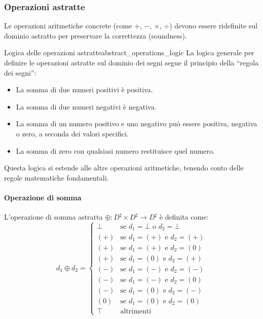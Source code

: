 \subsubsection{Operazioni astratte}
Le operazioni aritmetiche concrete (come $+$, $-$, $\times$, $\div$) devono
essere ridefinite sul dominio astratto per preservare la correttezza
(soundness).
\begin{nota}{Logica delle operazioni astratte}{abstract_operations_logic}
La logica generale per definire le operazioni astratte sul dominio dei segni
segue il principio della ``regola dei segni'':
\begin{itemize}
    \item La somma di due numeri positivi è positiva.
    \item La somma di due numeri negativi è negativa.
    \item La somma di un numero positivo e uno negativo può essere positiva,
    negativa o zero, a seconda dei valori specifici.
    \item La somma di zero con qualsiasi numero restituisce quel numero.
\end{itemize}

Questa logica si estende alle altre operazioni aritmetiche, tenendo conto
delle regole matematiche fondamentali.
\end{nota}

\paragraph{Operazione di somma}
L'operazione di somma astratta $\oplus: D^\sharp \times D^\sharp \to D^\sharp$
è definita come:
\[
d_1 \oplus d_2 =
\begin{cases}
    \bot & \text{se } d_1 = \bot \text{ o } d_2 = \bot \\
    (+) & \text{se } d_1 = (+) \text{ e } d_2 = (+) \\
    (+) & \text{se } d_1 = (+) \text{ e } d_2 = (0) \\
    (+) & \text{se } d_1 = (0) \text{ e } d_2 = (+) \\
    (-) & \text{se } d_1 = (-) \text{ e } d_2 = (-) \\
    (-) & \text{se } d_1 = (-) \text{ e } d_2 = (0) \\
    (-) & \text{se } d_1 = (0) \text{ e } d_2 = (-) \\
    (0) & \text{se } d_1 = (0) \text{ e } d_2 = (0) \\
    \top & \text{altrimenti}
\end{cases}
\]

